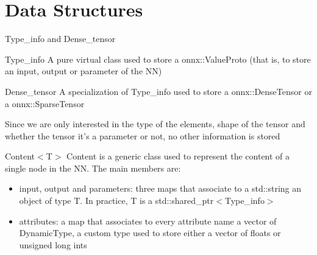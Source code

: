\section{Data Structures}

\begin{frame}[plain]{}
    \sectionpage
\end{frame}

\begin{frame}{Type\_info and Dense\_tensor}
    \begin{block} {Type\_info}
    A pure virtual class used to store a onnx::ValueProto (that is, to store an input, output or parameter of the NN)
    \end{block}
    
    \begin{block}{Dense\_tensor}
    A specialization of Type\_info used to store a onnx::DenseTensor or a onnx::SparseTensor
    \end{block}
    
    Since we are only interested in the type of the elements, shape of the tensor and whether the tensor it's a parameter or not, no other information is stored
\end{frame}

\begin{frame}{Content$<$T$>$}
    Content is a generic class used to represent the content of a single node in the NN. The main members are:
    
    \begin{itemize}
        \item input, output and parameters: three maps that associate to a std::string an object of type T. In practice, T is a std::shared\_ptr$<$Type\_info$>$
        \item attributes: a map that associates to every attribute name a vector of DynamicType, a custom type used to store either a vector of floats or unsigned long ints
    \end{itemize}
    
\end{frame}


